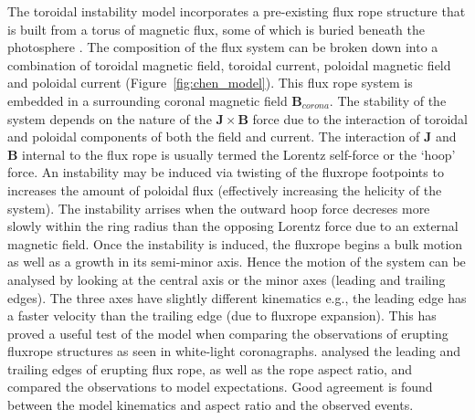 The toroidal instability model incorporates a pre-existing flux rope structure that is built from a torus of magnetic flux, some of which is buried beneath the photosphere \citep{chen1989}. The composition of the flux system can be broken down into a combination of toroidal magnetic field, toroidal current, poloidal magnetic field and poloidal current (Figure~\ref{fig:chen_model}). This flux rope system is embedded in a surrounding coronal magnetic field $\mathbf{B}_{corona}$. The stability of the system depends on the nature of the $\mathbf{J} \times \mathbf{B}$ force due to the interaction of toroidal and poloidal components of both the field and current. The interaction of $\mathbf{J}$ and $\mathbf{B}$ internal to the flux rope is usually termed the Lorentz self-force or the \textquoteleft hoop' force. An instability may be induced via twisting of the fluxrope footpoints to increases the amount of poloidal flux (effectively increasing the helicity of the system). The instability arrises when the outward hoop force decreses more slowly within the ring radius than the opposing Lorentz force due to an external magnetic field. Once the instability is induced, the fluxrope begins a bulk motion as well as a growth in its semi-minor axis. Hence the motion of the system can be analysed by looking at the central axis or the minor axes (leading and trailing edges). The three axes have slightly different kinematics e.g., the leading edge has a faster velocity than the trailing edge (due to fluxrope expansion). This has proved a useful test of the model when comparing the observations of erupting fluxrope structures as seen in white-light coronagraphs. \citet{krall2001} analysed the leading and trailing edges of erupting flux rope, as well as the rope aspect ratio, and compared the observations to model expectations. Good agreement is found between the model kinematics and aspect ratio and the observed events.
